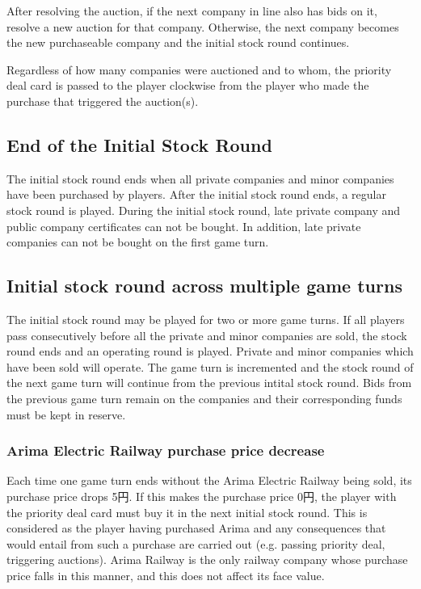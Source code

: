 \documentclass{article}
\begin{document}
\begin{CJK}{UTF8}{min}
\begin{multicols}{2}
After resolving the auction, if the next company in line also has bids
on it, resolve a new auction for that company. Otherwise, the next
company becomes the new purchaseable company and the initial stock
round continues.

Regardless of how many companies were auctioned and to whom, the
priority deal card is passed to the player clockwise from the player
who made the purchase that triggered the auction(s).

\subsection{End of the Initial Stock Round}
The initial stock round ends when all private companies and minor
companies have been purchased by players. After the initial stock
round ends, a regular stock round is played. During the initial stock
round, late private company and public company certificates can not be
bought. In addition, late private companies can not be bought on the
first game turn.

\subsection{Initial stock round across multiple game turns}
The initial stock round may be played for two or more game turns. If
all players pass consecutively before all the private and minor
companies are sold, the stock round ends and an operating round is
played. Private and minor companies which have been sold will
operate. The game turn is incremented and the stock round of the next
game turn will continue from the previous intital stock round. Bids
from the previous game turn remain on the companies and their corresponding
funds must be kept in reserve.

\subsubsection{Arima Electric Railway purchase price decrease}
\label{isr-arima}
Each time one game turn ends without the Arima Electric Railway being
sold, its purchase price drops 5円. If this makes the purchase
price 0円, the player with the priority deal card must buy it in
the next initial stock round. This is considered as the player
having purchased Arima and any consequences that would entail from
such a purchase are carried out (e.g. passing priority deal, triggering
auctions). Arima Railway is the only railway company whose purchase
price falls in this manner, and this does not affect its face value.


\end{multicols}
\end{CJK}
\end{document}

